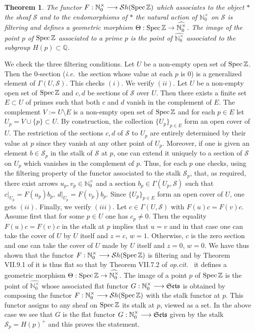 \documentclass[noams,lp]{compositio}
\newtheorem{thm}{Theorem}[section] %
\def\Spec{{\rm Spec\,}}
\def\N{{\mathbb N}}
\def\Q{{\mathbb Q}}
\def\Z{{\mathbb Z}}
\def\cS{{\mathcal S}}
\newcommand{\ie}{{\it i.e.\/}\ }
\newcommand{\opcit}{{\it op.cit.\/}\ }
\def\spz{{\Spec\Z}}
\def\Se{\frak{ Sets}}
\def\nto{\N_0^{\times}}
\def\wnto{{\widehat{\nto}}}
\begin{document}
\begin{thm}\label{thmspz}
The  functor $F:\nto\longrightarrow {\mathcal Sh}(\Spec\Z)$ which associates to the object $\ast$ the sheaf $\cS$ and to the endomorphisms of $\ast$ the natural action of $\nto$ on $\cS$ is filtering and defines a geometric morphism $\Theta: \Spec\Z\to \wnto$. The image of the point $p$ of $\spz$ associated to a prime $p$ is the point of $\wnto$ associated to the subgroup $H(p)\subset \Q$.
\end{thm}
\proof We check the three filtering conditions. Let $U$ be a non-empty open set of $\spz$. Then the $0$-section (\ie the section whose value at each $p$ is $0$) is a generalized  element of  $\Gamma(U,\cS)$. This checks $(i)$. We verify $(ii)$. Let $U$  be a non-empty open set of $\spz$ and $c,d$ be sections of $\cS$ over $U$. Then there exists a finite set $E\subset U$ of primes such that both $c$ and $d$ vanish in the complement of $E$. The complement $V:=U\setminus E$ is a non-empty open set of $\spz$ and for each $p\in E$  let $U_p=V\cup \{p\}\subset U$. By construction, the collection $\{U_p\}_{p\in E}$ form an open cover of $U$. The restriction of the sections $c,d$ of $\cS$ to $U_p$ are entirely determined by their value at $p$ since they vanish at any other point of 
$U_p$. Moreover, if one is given an element $b\in \cS_p$ in the stalk of $\cS$ at $p$, one can extend it uniquely to a section of $\cS$ on $U_p$ which vanishes in the complement of $p$. Thus, for each $p$ one checks, using the filtering property of the functor associated to the stalk $\cS_p$, that, as required, there exist arrows $u_p,v_p\in\nto$ and a section $b_p\in \Gamma(U_p,\cS)$ such that 
$
c\vert_{U_p}=F(u_p)b_p, \   d\vert_{U_p}=F(v_p)b_p.
$
Since $\{U_p\}_{p\in E}$ form an open cover of $U$, one  gets $(ii)$. Finally, we verify $(iii)$. Let $c\in\Gamma(U,\cS)$ with $F(u)c=F(v)c$. Assume first that for some $p\in U$ one has $c_p\neq 0$. Then the equality $F(u)c=F(v)c$ in the stalk at $p$ implies that $u=v$ and in that case one can take the cover of $U$ by $U$ itself and $z=c$, $w=1$. Otherwise,  $c$ is the zero section and one can take the cover of $U$ made by $U$ itself and $z=0$, $w=0$. We have thus shown that the functor $F:\nto\longrightarrow {\mathcal Sh}(\Spec\Z)$ is filtering and by Theorem VII.9.1 of \cite{MM} it is thus flat so that by Theorem VII.7.2 of \opcit 
it defines a geometric morphism $\Theta: \Spec\Z\to \wnto$. The image of a point $p$ of $\spz$ is the point of $\wnto$ whose associated flat functor $G:\nto\longrightarrow \Se$ is obtained by composing the functor $F:\nto\longrightarrow {\mathcal Sh}(\Spec\Z)$
with the stalk functor at $p$. This functor assigns to any sheaf on $\spz$ its stalk at $p$, viewed as a set. In the above case we see that $G$ is the flat functor $G:\nto\longrightarrow \Se$ given by the stalk $\cS_p=H(p)^+$ and this proves the  statement.\endproof
\end{document}
